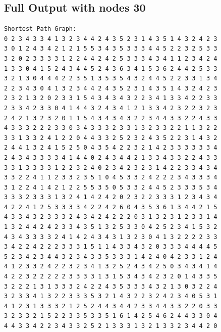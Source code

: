 \documentclass[11pt]{article}
\begin{document}
\subsection{Full Output with nodes 30}
\begin{lstlisting}
Shortest Path Graph:
0 2 3 4 3 3 4 1 3 2 3 4 4 2 4 3 5 2 3 1 4 3 5 1 4 3 2 4 2 3
3 0 1 2 4 3 4 2 1 2 1 5 5 3 4 3 5 3 3 3 4 4 5 2 2 3 2 5 3 3
3 2 0 2 3 3 3 3 1 2 2 4 4 2 4 2 5 3 3 3 4 3 4 1 1 2 3 4 2 4
1 3 3 0 4 1 5 2 4 3 4 4 5 2 4 3 6 3 4 1 5 3 6 2 4 4 2 5 3 3
3 2 1 3 0 4 4 4 2 2 3 5 1 3 5 3 5 4 3 2 4 4 5 2 2 3 3 1 3 4
2 2 3 4 3 0 4 1 3 2 3 4 4 2 4 3 5 2 3 1 4 3 5 1 4 3 2 4 2 3
2 3 2 1 3 2 0 2 3 3 1 5 4 3 4 3 4 3 2 2 3 4 1 3 3 4 2 2 3 3
2 3 3 4 2 3 3 0 4 1 4 4 3 2 4 3 4 1 2 1 3 3 4 2 3 2 2 3 2 3
2 4 2 1 3 2 3 2 0 1 1 5 4 3 4 3 4 3 2 2 3 4 4 3 3 2 2 4 3 3
4 3 3 3 2 2 2 3 3 0 3 4 3 3 3 2 3 3 1 3 2 3 3 2 2 1 1 3 2 2
3 3 1 3 3 2 4 1 2 2 0 4 4 3 3 2 5 2 3 2 4 3 5 2 2 3 1 4 3 2
2 4 4 1 3 2 4 1 5 2 5 0 4 3 5 4 2 2 3 2 1 4 2 3 3 3 3 3 3 4
2 4 3 4 3 3 3 3 4 1 4 4 0 2 4 3 4 4 2 1 3 3 4 3 3 2 2 4 3 3
3 3 1 3 3 3 3 1 2 2 3 2 4 0 2 3 4 2 3 2 3 1 4 2 2 3 3 4 3 4
3 3 2 2 4 1 1 2 3 3 2 3 5 1 0 4 5 3 3 2 4 2 2 2 3 4 3 3 3 4
3 1 2 2 4 1 4 2 1 2 2 5 5 3 5 0 5 3 3 2 4 4 5 2 3 3 3 5 3 4
3 3 3 2 3 3 3 1 3 2 4 1 4 2 4 2 0 2 3 2 2 3 3 3 1 2 3 4 3 4
4 2 2 4 1 2 5 3 3 3 3 4 2 2 4 2 6 0 4 3 5 3 6 1 3 4 4 2 1 5
4 3 3 4 3 2 3 3 3 2 4 3 4 2 4 2 2 2 0 3 1 3 2 3 1 2 3 3 1 4
1 3 2 4 4 2 4 2 3 3 4 3 5 1 3 2 5 3 3 0 4 2 5 2 3 4 1 5 3 2
4 3 4 3 3 3 3 2 4 1 4 2 4 3 4 3 1 3 2 3 0 4 1 3 2 2 2 2 3 3
3 4 2 2 4 2 2 2 3 3 3 1 5 1 1 4 3 3 4 3 2 0 3 3 3 4 4 4 4 5
5 2 3 4 2 3 4 4 3 2 3 4 3 3 5 3 3 3 1 4 2 4 0 4 2 3 3 1 2 4
4 1 2 3 3 2 4 2 2 3 2 3 4 1 3 2 5 2 4 3 4 2 5 0 3 4 3 4 1 4
4 2 2 3 2 2 2 2 2 3 3 3 3 1 3 1 5 3 4 3 4 2 3 2 0 1 4 3 3 5
3 2 2 2 1 3 1 3 3 3 2 4 2 2 4 3 5 3 3 3 4 3 2 1 3 0 3 2 2 4
3 2 3 3 4 1 3 2 2 3 3 3 5 3 2 1 4 3 2 2 3 2 4 2 3 4 0 5 3 1
4 1 2 3 1 3 3 3 2 1 2 5 2 4 4 3 4 4 2 3 3 4 4 3 3 2 2 0 3 3
3 2 3 3 2 1 5 2 2 3 3 5 3 3 5 1 6 1 4 2 5 4 6 2 4 4 3 3 0 4
4 4 3 3 4 2 2 3 4 3 3 2 5 2 1 3 3 3 1 3 2 1 3 3 2 3 4 4 2 0


\end{lstlisting}
\end{document}

